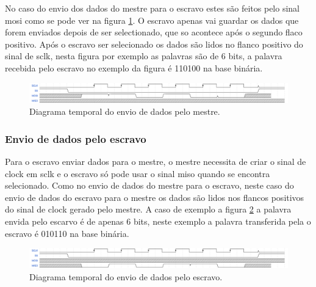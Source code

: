 No caso do envio dos dados do mestre para o escravo estes são feitos pelo sinal \acrshort{mosi} como se pode ver na figura \ref{fig:ondas_SPI_Se}. O escravo apenas vai guardar os dados que forem enviados depois de ser selectionado, que so acontece após o segundo flaco positivo. Após o escravo ser selecionado os dados são lidos no flanco positivo do sinal de \acrshort{sclk}, nesta figura por exemplo as palavras são de 6 bits, a palavra recebida pelo escravo no exemplo da figura é 110100 na base binária.

\begin{figure}[!htb]
  \centering
  \includegraphics[width=1.00\textwidth]{ondas/SPI_Se.pdf} %
  \caption[Diagrama temporal do envio de dados pelo mestre.]{Diagrama temporal do envio de dados pelo mestre.}
  \label{fig:ondas_SPI_Se}
\end{figure}

\subsubsection{Envio de dados pelo escravo}

Para o escravo enviar dados para o mestre, o mestre necessita de criar o sinal de clock em \acrshort{sclk} e o escravo só pode usar o sinal \acrshort{miso} quando se encontra selecionado. Como no envio de dados do mestre para o escravo, neste caso do envio de dados do escravo para o mestre os dados são lidos nos flancos positivos do sinal de clock gerado pelo mestre. A caso de exemplo a figura \ref{fig:ondas_SPI_Re} a palavra envida pelo escarvo é de apenas 6 bits, neste exemplo a palavra transferida pela o escravo é 010110 na base binária. 

\begin{figure}[!htb]
  \centering
  \includegraphics[width=1.00\textwidth]{ondas/SPI_Re.pdf} %
  \caption[Diagrama temporal do envio de dados pelo escravo.]{Diagrama temporal do envio de dados pelo escravo.}
  \label{fig:ondas_SPI_Re}
\end{figure}
